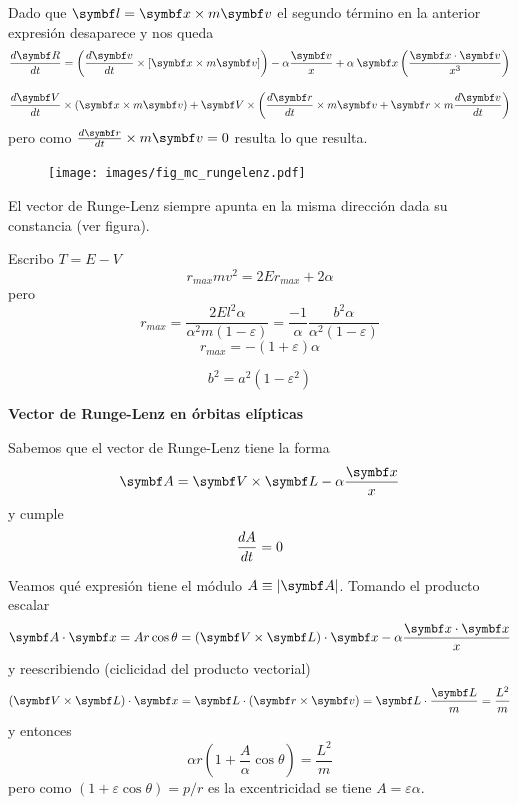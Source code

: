 \documentclass[10pt,oneside]{CBFT_book}
\begin{document}
Dado que $\vb{l} = \vb{x} \times m \vb{v}$ el segundo término en la anterior expresión desaparece y nos queda
\[
	\dtot{\vb{R}}{t} = \left( \dtot{\vb{v}}{t} \times [ \vb{x} \times m\vb{v} ] \right) 
	- \alpha\frac{ \vb{v} }{x} + \alpha \:\vb{x} \left( \frac{ \pe{x}{v} }{x^3}\right) 
\]


\[
	\dtot{\vb{V}}{t} \times ( \vb{x} \times m\vb{v} ) +
	\vb{V} \times \left( \dtot{\vb{r}}{t} \times m\vb{v} + \vb{r} \times m\dtot{\vb{v}}{t} \right)
\]
pero como $\dtot{\vb{r}}{t} \times m\vb{v} = 0$ resulta lo que resulta.
\begin{figure}[hbt]
	\begin{center}
	\texttt{[image: images/fig\_mc\_rungelenz.pdf]}	 
	\end{center}
	\caption{}
\end{figure} 

El vector de Runge-Lenz siempre apunta en la misma dirección dada su constancia (ver figura).

Escribo $ T = E - V $
\[
	r_{max} m v^2 = 2Er_{max} + 2\alpha
\]
pero 
\[
	r_{max} = \frac{2 E l^2 \alpha}{\alpha^2 m (1-\varepsilon)} = \frac{-1}{\alpha}\frac{b^2 
\alpha}{\alpha^2(1-\varepsilon)}
\]
\[
	r_{max} = - (1+\varepsilon) \alpha
\]

\[
	b^2 = a^2( 1 - \varepsilon^2 )
\]

\begin{ejemplo}{\bfseries Vector de Runge-Lenz en órbitas elípticas}

Sabemos que el vector de Runge-Lenz tiene la forma 
\[
	\vb{A} = \pv{V}{L} - \alpha \frac{\vb{x}}{x}
\]
y cumple 
\[
	\frac{d^{\hspace{-0.05em}} {A}}{d {t}^{\hspace{-0.05em}}} = 0
\]

Veamos qué expresión tiene el módulo $ A \equiv |\vb{A}| $. Tomando el producto escalar 
\[
	\pe{A}{x} = A r \cos \theta = ( \pv{V}{L} )\cdot \vb{x} - \alpha \frac{\pe{x}{x}}{x}
\]
y reescribiendo (ciclicidad del producto vectorial)
\[
	( \pv{V}{L} )\cdot \vb{x} = \vb{L} \cdot ( \pv{r}{v} ) = \vb{L} \cdot \frac{ \vb{L} }{m} = \frac{L^2}{m}
\]
y entonces
\[
	\alpha r \left( 1 + \frac{A}{\alpha} \cos \theta \right) = \frac{L^2}{m}
\]
pero como $ (1 + \varepsilon \cos \theta ) = p / r $ es la excentricidad se tiene $ A = \varepsilon \alpha $.

\end{ejemplo}
\end{document}
